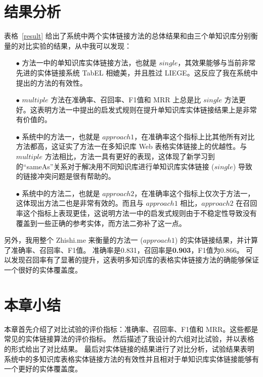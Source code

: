 \section{结果分析}
表格~\ref{result} 给出了系统中两个实体链接方法的总体结果和由三个单知识库分别衡量的对比实验的结果，从中我可以发现：
\begin{itemize}
  \item[$\bullet$] 方法一中的单知识库实体链接方法，也就是 $single$，其效果能够与当前非常先进的实体链接系统 TabEL 相媲美，并且胜过 LIEGE。这反应了我在系统中提出的方法的有效性。
  \item[$\bullet$] $multiple$ 方法在准确率、召回率、F1值和 MRR 上总是比 $single$ 方法更好。这表明方法一中提出的启发式规则在提升单知识库实体链接结果上是非常有价值的。
  \item[$\bullet$] 系统中的方法一，也就是 $approach1$，在准确率这个指标上比其他所有对比方法都高，这证实了方法一在多知识库 Web 表格实体链接上的优越性。与 $multiple$ 方法相比，方法一具有更好的表现，这体现了新学习到的``sameAs''关系对于解决用不同知识库进行单知识库实体链接 ($single$) 导致的链接冲突问题是很有帮助的。
  \item[$\bullet$] 系统中的方法二，也就是 $approach2$，在准确率这个指标上仅次于方法一，这体现出方法二也是非常有效的。而且与 $approach1$ 相比，$approach2$ 在召回率这个指标上表现更佳，这说明方法一中的启发式规则由于不稳定性导致没有覆盖到一些正确的参考实体，而方法二弥补了这一点。
\end{itemize}
另外，我用整个 Zhishi.me 来衡量的方法一 ($approach1$) 的实体链接结果，并计算了准确率、召回率、F1值。
准确率是0.831，召回率是\textbf{0.903}，F1值为0.866。
可以发现召回率有了显著的提升，这表明多知识库的表格实体链接方法的确能够保证一个很好的实体覆盖度。


\section{本章小结}
本章首先介绍了对比试验的评价指标：准确率、召回率、F1值和 MRR。这些都是常见的实体链接算法的评价指标。
然后描述了我设计的六组对比试验，并以表格的形式给出了对比结果。
最后对实体链接的结果进行了对比分析，试验结果表明系统中的多知识库表格实体链接方法的有效性并且相对于单知识库实体链接能够有一个更好的实体覆盖度。